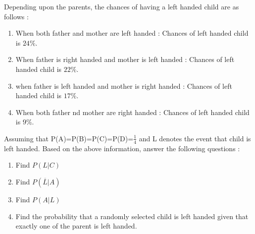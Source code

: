 \documentclass{article}
\begin{document}
\begin{enumerate}
Depending upon the parents, the chances of having a left handed child are as follows :\\
\begin{enumerate}
\item   When both father and mother are left handed :
        Chances of left handed child is $24\%$.
\item   When father is right handed and mother is left handed :
        Chances of left handed child is $22\%$.
\item   when father is left handed and mother is right handed :
        Chances of left handed child is $17\%$.
\item   When both father nd mother are right handed :
        Chances of left handed child is $9\%$.
\end{enumerate}
Assuming that P(A)=P(B)=P(C)=P(D)=$\frac{1}{4}$ and L denotes the event that child is left handed.
Based on the above information, answer the following questions :\\
\begin{enumerate}
\item    Find $P(L|C)$
\item    Find $P(\overline{L}|A)$
\item    Find $P(A|L)$
\item    Find the probability that a randomly selected child is left handed given that exactly one of the parent is left handed.
\end{enumerate}
\end{enumerate}
\end{document}

